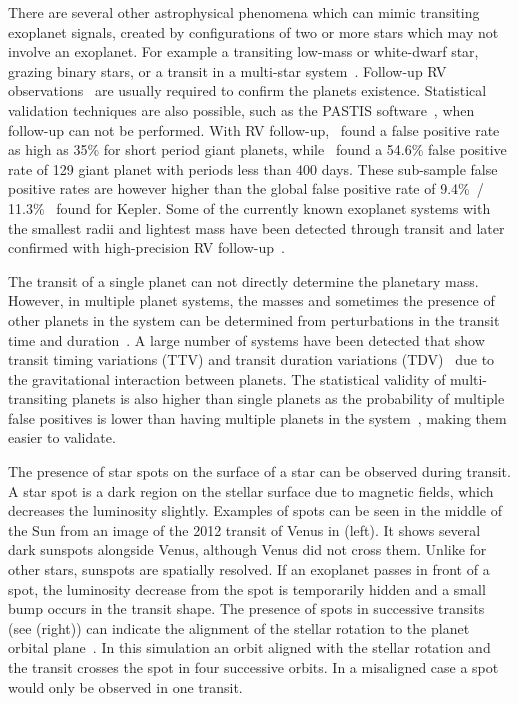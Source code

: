 There are several other astrophysical phenomena which can mimic transiting exoplanet signals, created by configurations of two or more stars which may not involve an exoplanet.
For example a transiting low-mass or white-dwarf star, grazing binary stars, or a transit in a multi-star system~\citep[see e.g.][]{cameron_extrasolar_2012, santerne_contribution_2013}.
Follow-up {RV} observations~\citep[e.g.][]{santerne_radial_2011} are usually required to confirm the planets existence.
Statistical validation techniques are also possible, such as the PASTIS software~\citep{diaz_pastis_2014}, when follow-up can not be performed.
With {RV} follow-up,~\citet{santerne_sophie_2012} found a false positive rate as high as 35\% for short period giant planets, while~\citet{santerne_sophie_2016} found a 54.6\% false positive rate of 129 giant planet with periods less than 400 days.
These sub-sample false positive rates are however higher than the global false positive rate of 9.4\%~\citep{fressin_false_2013}/ 11.3\%~\citep{santerne_contribution_2013} found for Kepler.
Some of the currently known exoplanet systems with the smallest radii and lightest mass have been detected through transit and later confirmed with high-precision {RV} follow-up~\citep[e.g.][]{queloz_corot7_2009, pepe_earthsized_2013, lopez-morales_kepler21b_2016, ment_second_2018}.

The transit of a single planet can not directly determine the planetary mass.
However, in multiple planet systems, the masses and sometimes the presence of other planets in the system can be determined from perturbations in the transit time and duration~\citep[e.g.][]{holman_use_2005, holman_kepler9_2010}.
A large number of systems have been detected that show transit timing variations (TTV) and transit duration variations (TDV)~\citep[e.g.][]{holczer_transit_2016} due to the gravitational interaction between planets.
The statistical validity of multi-transiting planets is also higher than single planets as the probability of multiple false positives is lower than having multiple planets in the system~\citep{lissauer_almost_2012}, making them easier to validate.

The presence of star spots on the surface of a star can be observed during transit.
A star spot is a dark region on the stellar surface due to magnetic fields, which decreases the luminosity slightly. Examples of spots can be seen in the middle of the Sun from an image of the 2012 transit of Venus in  (left). It shows several dark sunspots alongside Venus, although Venus did not cross them. Unlike for other stars, sunspots are spatially resolved.
If an exoplanet passes in front of a spot, the luminosity decrease from the spot is temporarily hidden and a small bump occurs in the transit shape.
The presence of spots in successive transits (see  (right)) can indicate the alignment of the stellar rotation to the planet orbital plane~\citep{sanchis-ojeda_starspots_2013}. In this simulation an orbit aligned with the stellar rotation and the transit crosses the spot in four successive orbits. In a misaligned case a spot would only be observed in one transit.

